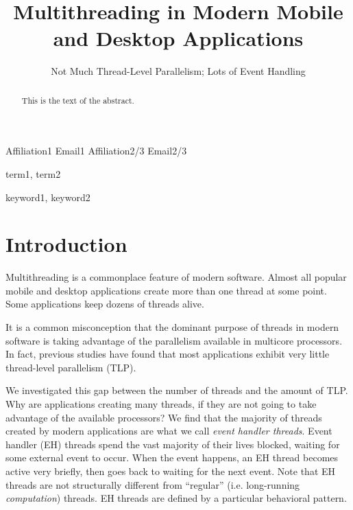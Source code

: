 \documentclass[11pt]{sigplanconf}
\begin{document}
\setlength{\pdfpageheight}{\paperheight}
\setlength{\pdfpagewidth}{\paperwidth}



\title{Multithreading in Modern Mobile and Desktop Applications}
\subtitle{Not Much Thread-Level Parallelism; Lots of Event Handling}

           {Affiliation1}
           {Email1}
           {Affiliation2/3}
           {Email2/3}

\maketitle

\begin{abstract}
This is the text of the abstract.
\end{abstract}


\terms
term1, term2

\keywords
keyword1, keyword2

\section{Introduction}

Multithreading is a commonplace feature of modern software.  Almost all
popular mobile and desktop applications create more than one thread at
some point.  Some applications keep dozens of threads alive.

It is a common misconception that the dominant purpose of threads in
modern software is taking advantage of the parallelism available in
multicore processors.  In fact, previous studies have found that most
applications exhibit very little thread-level parallelism (TLP).

We investigated this gap between the number of threads and the amount of
TLP.  Why are applications creating many threads, if they are not going
to take advantage of the available processors?  We find that the
majority of threads created by modern applications are what we call
\emph{event handler threads}.  Event handler (EH) threads spend the vast
majority of their lives blocked, waiting for some external event to
occur.  When the event happens, an EH thread becomes active very
briefly, then goes back to waiting for the next event.  Note that EH
threads are not structurally different from ``regular''
(i.e. long-running \emph{computation}) threads.  EH threads are defined
by a particular behavioral pattern.
\end{document}
